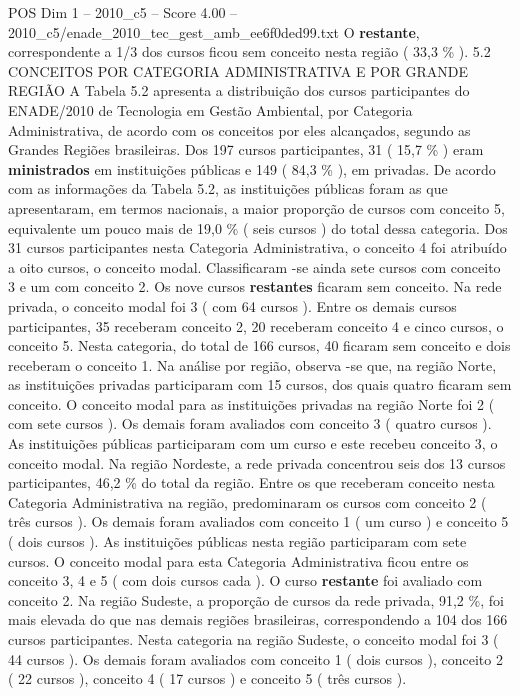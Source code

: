 \begin{textsample}{POS Dim 1 – 2010\_c5 – Score 4.00 – 2010\_c5/enade\_2010\_tec\_gest\_amb\_ee6f0ded99.txt}
O \textbf{restante}, correspondente a 1/3 dos cursos ficou sem conceito nesta região ( 33,3 \% ). 5.2 CONCEITOS POR CATEGORIA ADMINISTRATIVA E POR GRANDE REGIÃO A Tabela 5.2 apresenta a distribuição dos cursos participantes do ENADE/2010 de Tecnologia em Gestão Ambiental, por Categoria Administrativa, de acordo com os conceitos por eles alcançados, segundo as Grandes Regiões brasileiras.
Dos 197 cursos participantes, 31 ( 15,7 \% ) eram \textbf{ministrados} em instituições públicas e 149 ( 84,3 \% ), em privadas.
De acordo com as informações da Tabela 5.2, as instituições públicas foram as que apresentaram, em termos nacionais, a maior proporção de cursos com conceito 5, equivalente um pouco mais de 19,0 \% ( seis cursos ) do total dessa categoria.
Dos 31 cursos participantes nesta Categoria Administrativa, o conceito 4 foi atribuído a oito cursos, o conceito modal.
Classificaram -se ainda sete cursos com conceito 3 e um com conceito 2.
Os nove cursos \textbf{restantes} ficaram sem conceito.
Na rede privada, o conceito modal foi 3 ( com 64 cursos ).
Entre os demais cursos participantes, 35 receberam conceito 2, 20 receberam conceito 4 e cinco cursos, o conceito 5.
Nesta categoria, do total de 166 cursos, 40 ficaram sem conceito e dois receberam o conceito 1.
Na análise por região, observa -se que, na região Norte, as instituições privadas participaram com 15 cursos, dos quais quatro ficaram sem conceito.
O conceito modal para as instituições privadas na região Norte foi 2 ( com sete cursos ).
Os demais foram avaliados com conceito 3 ( quatro cursos ).
As instituições públicas participaram com um curso e este recebeu conceito 3, o conceito modal.
Na região Nordeste, a rede privada concentrou seis dos 13 cursos participantes, 46,2 \% do total da região.
Entre os que receberam conceito nesta Categoria Administrativa na região, predominaram os cursos com conceito 2 ( três cursos ).
Os demais foram avaliados com conceito 1 ( um curso ) e conceito 5 ( dois cursos ).
As instituições públicas nesta região participaram com sete cursos.
O conceito modal para esta Categoria Administrativa ficou entre os conceito 3, 4 e 5 ( com dois cursos cada ).
O curso \textbf{restante} foi avaliado com conceito 2.
Na região Sudeste, a proporção de cursos da rede privada, 91,2 \%, foi mais elevada do que nas demais regiões brasileiras, correspondendo a 104 dos 166 cursos participantes.
Nesta categoria na região Sudeste, o conceito modal foi 3 ( 44 cursos ).
Os demais foram avaliados com conceito 1 ( dois cursos ), conceito 2 ( 22 cursos ), conceito 4 ( 17 cursos ) e conceito 5 ( três cursos ).

\end{textsample}
